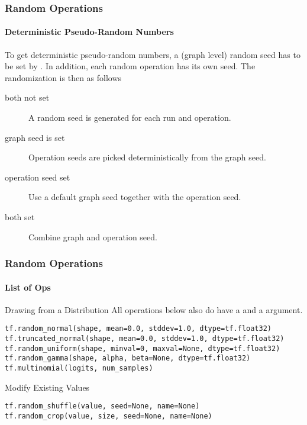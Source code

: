 \begin{frame}
    \frametitle{Random Operations}
    \framesubtitle{Deterministic Pseudo-Random Numbers}
    To get deterministic pseudo-random numbers, a (graph level) random seed has to be set by
    . In addition, each random operation has its own seed. The randomization
    is then as follows
    \begin{description}
        \item[both not set] A random seed is generated for each run and operation.
        \item[graph seed is set] Operation seeds are picked deterministically from the graph seed.
        \item[operation seed set] Use a default graph seed together with the operation seed.
        \item[both set] Combine graph and operation seed. 
    \end{description}
\end{frame}

\begin{frame}[fragile]
    \frametitle{Random Operations}
    \framesubtitle{List of Ops}
    \begin{block}{Drawing from a Distribution}
    All operations below also do have a  and a  argument.
    \begin{lstlisting}
tf.random_normal(shape, mean=0.0, stddev=1.0, dtype=tf.float32)
tf.truncated_normal(shape, mean=0.0, stddev=1.0, dtype=tf.float32)
tf.random_uniform(shape, minval=0, maxval=None, dtype=tf.float32)
tf.random_gamma(shape, alpha, beta=None, dtype=tf.float32)
tf.multinomial(logits, num_samples)
\end{lstlisting}       
    \end{block}

    \begin{block}{Modify Existing Values}
        \begin{lstlisting}
tf.random_shuffle(value, seed=None, name=None)
tf.random_crop(value, size, seed=None, name=None)
\end{lstlisting}
    \end{block}
\end{frame}

